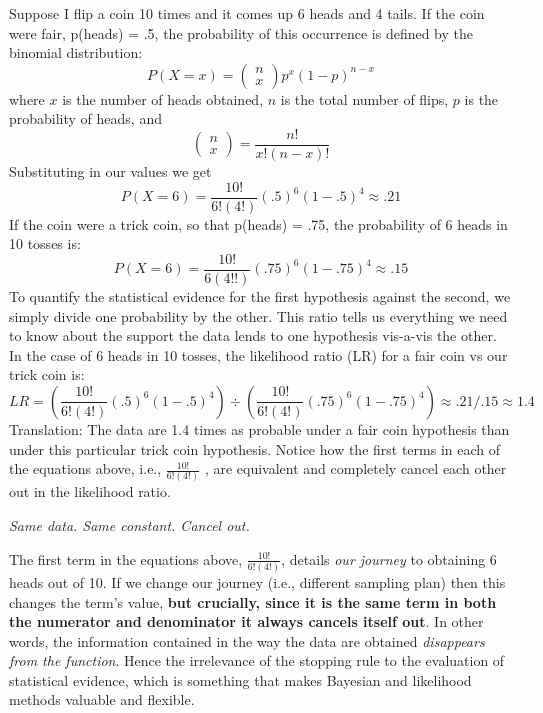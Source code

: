 Suppose I flip a coin 10 times and it comes up 6 heads and 4 tails. If the coin were fair, p(heads) = .5, the probability of this occurrence is defined by the binomial distribution:
\begin{equation}
P(X=x)=
\left(\begin{array}{l}
n \\x\end{array}\right) 
p^{x}(1-p)^{n-x}
\end{equation}
where $x$ is the number of heads obtained, $n$ is the total number of flips, $p$ is the probability of heads, and
\begin{equation}
\left(\begin{array}{l}
n \\x\end{array}\right)
=\frac{n !}{x !(n-x) !}
\end{equation}
Substituting in our values we get
\begin{equation}P(X=6)=\frac{10 !}{6 !(4 !)}(.5)^{6}(1-.5)^{4} \approx .21\end{equation}
If the coin were a trick coin, so that p(heads) = .75, the probability of 6 heads in 10 tosses is:
\begin{equation}P(X=6)=\frac{10 !}{6(4 ! !)}(.75)^{6}(1-.75)^{4} \approx .15\end{equation}
To quantify the statistical evidence for the first hypothesis against the second, we simply divide one probability by the other. This ratio tells us everything we need to know about the support the data lends to one hypothesis vis-a-vis the other.  In the case of 6 heads in 10 tosses, the likelihood ratio (LR) for a fair coin vs our trick coin is:
\begin{equation}L R=\left(\frac{10 !}{6 !(4 !)}(.5)^{6}(1-.5)^{4}\right) \div\left(\frac{10 !}{6 !(4 !)}(.75)^{6}(1-.75)^{4}\right) \approx .21 / .15 \approx 1.4\end{equation}
Translation: The data are 1.4 times as probable under a fair coin hypothesis than under this particular trick coin hypothesis. Notice how the first terms in each of the equations above, i.e., $\frac{10 !}{6 !(4 !)}$ , are equivalent and completely cancel each other out in the likelihood ratio.

\textsl{Same data. Same constant. Cancel out.}

The first term in the equations above, $\frac{10 !}{6 !(4 !)}$, details \textit{our journey} to obtaining 6 heads out of 10. If we change our journey (i.e., different sampling plan) then this changes the term's value, \textbf{but crucially, since it is the same term in both the numerator and denominator it always cancels itself out}. In other words, the information contained in the way the data are obtained \textit{disappears from the function}. Hence the irrelevance of the stopping rule to the evaluation of statistical evidence, which is something that makes Bayesian and likelihood methods valuable and flexible.

